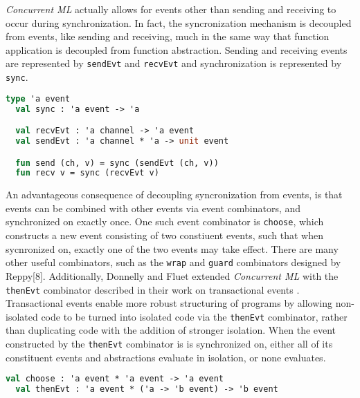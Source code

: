 \documentclass{article}
\begin{document}
\textit{Concurrent ML} actually allows for events other than sending and receiving to
occur during synchronization. In fact, the syncronization mechanism is decoupled from
events, like sending and receiving, much in the same way that function application is decoupled
from function abstraction. Sending and receiving events are represented by \lstinline{sendEvt}
and \lstinline{recvEvt} and synchronization is represented by \lstinline{sync}.

\begin{lstlisting}[language=ML, escapechar=\%]
  type 'a event
  val sync : 'a event -> 'a

  val recvEvt : 'a channel -> 'a event
  val sendEvt : 'a channel * 'a -> unit event

  fun send (ch, v) = sync (sendEvt (ch, v))
  fun recv v = sync (recvEvt v)
  \end{lstlisting}

An advantageous consequence of decoupling syncronization from events, is that events can be
combined with other events via event combinators, and synchronized on exactly once. One such
event combinator is \lstinline{choose}, which constructs a new event consisting of two
constiuent events, such that when sycnronized on, exactly one of the two events may take
effect. There are many other useful combinators, such as the \lstinline{wrap} and
\lstinline{guard} combinators designed by Reppy[8]. Additionally, Donnelly and Fluet extended
\textit{Concurrent ML} with the \lstinline{thenEvt} combinator described in their work on
transactional events \cite{transactional_events}. Transactional events enable more robust
structuring of programs by allowing non-isolated code to be turned into isolated code via
the \lstinline{thenEvt} combinator, rather than duplicating code with the addition of stronger
isolation. When the event constructed by the \lstinline{thenEvt} combinator is is synchronized
on, either all of its constituent events and abstractions evaluate in isolation, or none
evaluates.

\begin{lstlisting}[language=ML, escapechar=\%]
  val choose : 'a event * 'a event -> 'a event
  val thenEvt : 'a event * ('a -> 'b event) -> 'b event
  \end{lstlisting}
\end{document}
